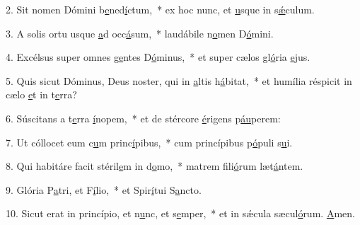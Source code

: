 2. Sit nomen Dómini b\uline{e}ned\uline{í}ctum,~* ex hoc nunc, et \uline{u}sque in s\uline{ǽ}culum.\par 
3. A solis ortu usque \uline{a}d occ\uline{á}sum,~* laudábile n\uline{o}men D\uline{ó}mini.\par 
4. Excélsus super omnes g\uline{e}ntes D\uline{ó}minus,~* et super cælos gl\uline{ó}ria \uline{e}jus.\par 
5. Quis sicut Dóminus, Deus noster, qui in \uline{a}ltis h\uline{á}bitat,~* et humília réspicit in cælo \uline{e}t in t\uline{e}rra?\par 
6. Súscitans a t\uline{e}rra \uline{í}nopem,~* et de stércore \uline{é}rigens p\uline{áu}perem:\par 
7. Ut cóllocet eum c\uline{u}m princ\uline{í}pibus,~* cum princípibus p\uline{ó}puli s\uline{u}i.\par 
8. Qui habitáre facit stéril\uline{e}m in d\uline{o}mo,~* matrem fili\uline{ó}rum læt\uline{á}ntem.\par 
9. Glória P\uline{a}tri, et F\uline{í}lio,~* et Spir\uline{í}tui S\uline{a}ncto.\par 
10. Sicut erat in princípio, et n\uline{u}nc, et s\uline{e}mper,~* et in sǽcula sæcul\uline{ó}rum. \uline{A}men.\par 
